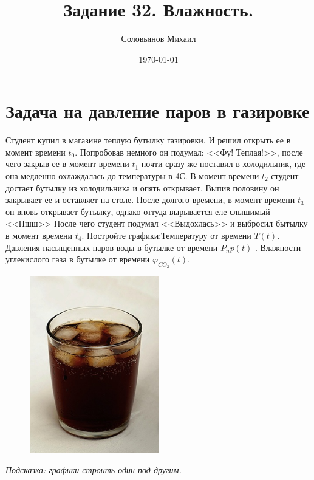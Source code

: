 \documentclass[a4paper,12pt]{article} %
\author{Соловьянов Михаил }
\title{Задание 32. Влажность.}
\date{\today}
\begin{document}
\maketitle

\section{ Задача на давление паров в газировке }

Студент купил в магазине теплую бутылку газировки. И решил открыть ее в момент времени $t_0$. Попробовав немного он подумал: <<Фу! Теплая!>>, после чего закрыв ее в момент времени  $t_1$ почти сразу же поставил в холодильник, где она медленно охлаждалась до температуры в 4\textdegree С. В момент времени $t_2$ студент достает бутылку из холодильника и опять открывает. Выпив половину он закрывает ее и оставляет на столе. После долгого времени, в момент времени $t_3$ он вновь открывает бутылку, однако оттуда вырывается еле слышимый <<Пшш>> После чего студент подумал <<Выдохлась>> и выбросил бытылку в момент времени $t_4$. Постройте графики:Температуру от времени $ T(t) $. Давления насыщенных паров воды в бутылке от времени $ P_np(t) $ . Влажности углекислого газа в бутылке от времени $ \varphi_{CO_2}(t) $. 


\begin{figure}[h]
\centering
\includegraphics[width=0.5\textwidth]{cola.jpeg}
\end{figure}


\textit{Подсказка: графики строить один под другим.}
\end{document}
